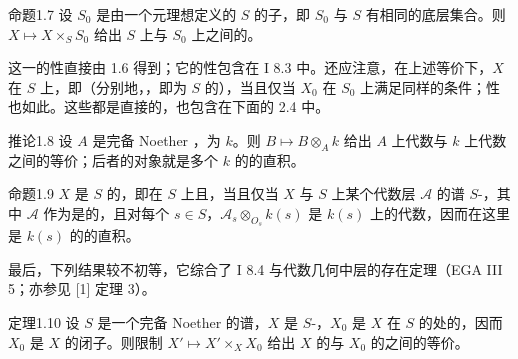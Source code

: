 \begin{SGAresult}{命题}{1.7}
设 $S_0$ 是由一个元理想定义的 $S$ 的子，即 $S_0$ 与 $S$ 有相同的底层集合。则 $X\mapsto X\times_S S_0$ 给出 $S$ 上与 $S_0$ 上之间的。
\end{SGAresult}

这一的性直接由 1.6 得到；它的性包含在 I 8.3 中。还应注意，在上述等价下，$X$ 在 $S$ 上，即（分别地，，即为 $S$ 的），当且仅当 $X_0$ 在 $S_0$ 上满足同样的条件；性也如此。这些都是直接的，也包含在下面的 2.4 中。
\begin{SGAresult}{推论}{1.8}
设 $A$ 是完备 Noether ，为 $k$。则 $B\mapsto B\otimes_A k$ 给出 $A$ 上代数与 $k$ 上代数之间的等价；后者的对象就是多个 $k$ 的的直积。
\end{SGAresult}
\begin{SGAresult}{命题}{1.9}
$X$ 是 $S$ 的，即在 $S$ 上且，当且仅当 $X$ 与 $S$ 上某个代数层 $\mathcal A$ 的谱 $S$-，其中 $\mathcal A$ 作为是的，且对每个 $s\in S$，$\mathcal A_s\otimes_{O_s}k(s)$ 是 $k(s)$ 上的代数，因而在这里是 $k(s)$ 的的直积。
\end{SGAresult}
最后，下列结果较不初等，它综合了 I 8.4 与代数几何中层的存在定理（EGA III 5；亦参见 [1] 定理 3）。
\begin{SGAresult}{定理}{1.10}
设 $S$ 是一个完备 Noether 的谱，$X$ 是 $S$-，$X_0$ 是 $X$ 在 $S$ 的处的，因而 $X_0$ 是 $X$ 的闭子。则限制 $X'\mapsto X'\times_X X_0$ 给出 $X$ 的与 $X_0$ 的之间的等价。
\end{SGAresult}

